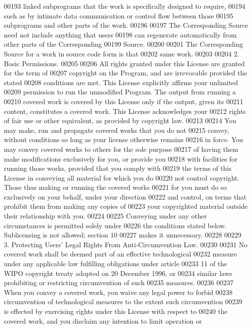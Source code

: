 \begin{DoxyCode}
00193 linked subprograms that the work is specifically designed to require,
00194 such as by intimate data communication or control flow between those
00195 subprograms and other parts of the work.
00196 
00197   The Corresponding Source need not include anything that users
00198 can regenerate automatically from other parts of the Corresponding
00199 Source.
00200 
00201   The Corresponding Source for a work in source code form is that
00202 same work.
00203 
00204   2. Basic Permissions.
00205 
00206   All rights granted under this License are granted for the term of
00207 copyright on the Program, and are irrevocable provided the stated
00208 conditions are met.  This License explicitly affirms your unlimited
00209 permission to run the unmodified Program.  The output from running a
00210 covered work is covered by this License only if the output, given its
00211 content, constitutes a covered work.  This License acknowledges your
00212 rights of fair use or other equivalent, as provided by copyright law.
00213 
00214   You may make, run and propagate covered works that you do not
00215 convey, without conditions so long as your license otherwise remains
00216 in force.  You may convey covered works to others for the sole purpose
00217 of having them make modifications exclusively for you, or provide you
00218 with facilities for running those works, provided that you comply with
00219 the terms of this License in conveying all material for which you do
00220 not control copyright.  Those thus making or running the covered works
00221 for you must do so exclusively on your behalf, under your direction
00222 and control, on terms that prohibit them from making any copies of
00223 your copyrighted material outside their relationship with you.
00224 
00225   Conveying under any other circumstances is permitted solely under
00226 the conditions stated below.  Sublicensing is not allowed; section 10
00227 makes it unnecessary.
00228 
00229   3. Protecting Users' Legal Rights From Anti-Circumvention Law.
00230 
00231   No covered work shall be deemed part of an effective technological
00232 measure under any applicable law fulfilling obligations under article
00233 11 of the WIPO copyright treaty adopted on 20 December 1996, or
00234 similar laws prohibiting or restricting circumvention of such
00235 measures.
00236 
00237   When you convey a covered work, you waive any legal power to forbid
00238 circumvention of technological measures to the extent such circumvention
00239 is effected by exercising rights under this License with respect to
00240 the covered work, and you disclaim any intention to limit operation or

\end{DoxyCode}
